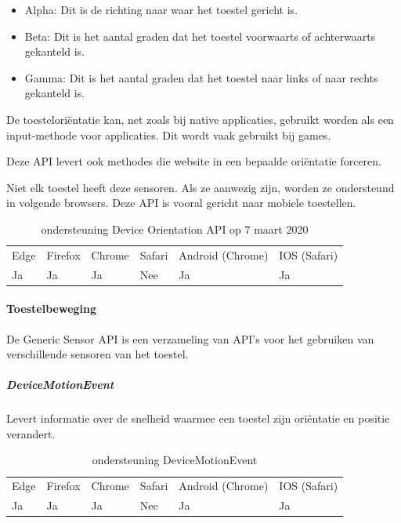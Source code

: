  \begin{itemize}
	\item	Alpha:  Dit is de richting naar waar het toestel gericht is.
	\item	Beta:  Dit is het aantal graden dat het toestel voorwaarts of achterwaarts gekanteld is.
	\item   Gamma: Dit is het aantal graden dat het toestel naar links of naar rechts gekanteld is.
\end{itemize}


De toesteloriëntatie kan, net zoals bij native applicaties, gebruikt worden als een input-methode voor applicaties. Dit wordt vaak gebruikt bij games.

Deze API levert ook methodes die website in een bepaalde oriëntatie forceren.

Niet elk toestel heeft deze sensoren. Als ze aanwezig zijn, worden ze ondersteund in volgende browsers. Deze API is vooral gericht naar mobiele toestellen. 

\begin{table}[H]
	\centering
	\begin{tabular}{llllll}
		Edge & Firefox & Chrome & Safari & Android (Chrome) & IOS (Safari) \\
		Ja   & Ja      &  Ja   & Nee     & Ja               & Ja          
	\end{tabular}	
	\caption{ondersteuning Device Orientation API op 7 maart 2020}
\end{table}

\paragraph{Toestelbeweging}
De Generic Sensor API \autocite{Waldroon2019} is een verzameling van API’s voor het gebruiken van verschillende sensoren van het toestel.

	\subparagraph{DeviceMotionEvent }
	Levert informatie over de snelheid waarmee een toestel zijn oriëntatie en positie verandert.
	
	\begin{table}[H]
		\centering
		\begin{tabular}{llllll}
			Edge & Firefox & Chrome & Safari & Android (Chrome) & IOS (Safari) \\
			Ja   & Ja      &  Ja   & Nee     & Ja               & Ja          
		\end{tabular}	
		\caption{ondersteuning	DeviceMotionEvent  }
	\end{table} 
	

